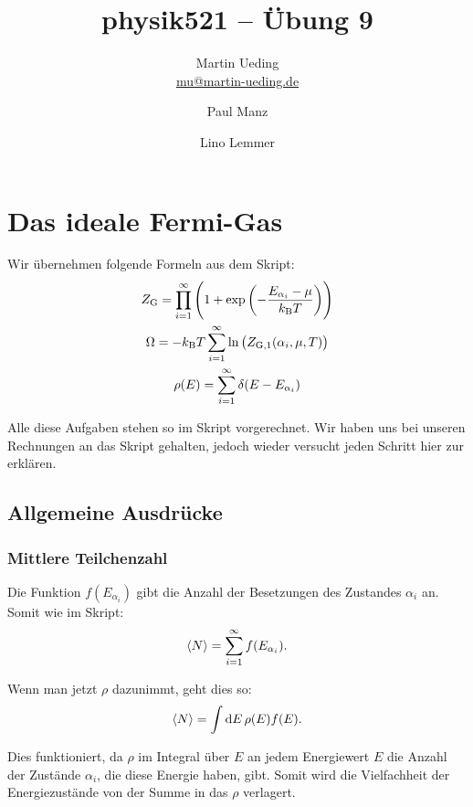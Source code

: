 

\hypersetup{
	pdftitle=
}

\title{physik521 -- Übung 9}
\author{
	Martin Ueding \\ \small{\href{mailto:mu@martin-ueding.de}{mu@martin-ueding.de}}
        \and
        Paul Manz
        \and
        Lino Lemmer
}



\maketitle

\section{Das ideale Fermi-Gas}

\newcommand\kB{k_\text B}
\newcommand\ZG{Z_\text G}
\newcommand\ZGe{Z_{\text G, 1}}
\newcommand\Eai{E_{\alpha_i}}
\newcommand\isum{\sum_{i=1}^\infty }

Wir übernehmen folgende Formeln aus dem Skript:
\begin{gather*}
    \ZG = \prod_{i=1}^\infty \del{1 + \exp\del{- \frac{\Eai - \mu}{\kB T}}} \\
    \Omega = - \kB T \isum \ln \del{\ZGe(\alpha_i, \mu, T)} \\
    \rho(E) = \isum \delta(E - \Eai)
\end{gather*}

Alle diese Aufgaben stehen so im Skript vorgerechnet. Wir haben uns bei
unseren Rechnungen an das Skript gehalten, jedoch wieder versucht jeden
Schritt hier zur erklären.

\subsection{Allgemeine Ausdrücke}

\subsubsection{Mittlere Teilchenzahl}

Die Funktion $f(\Eai)$ gibt die Anzahl der Besetzungen des Zustandes $\alpha_i$ an. Somit wie im Skript:
\[
    \bracket N = \isum f(\Eai).
\]

Wenn man jetzt $\rho$ dazunimmt, geht dies so:
\[
    \bracket N = \int \dif E \, \rho(E) f(E).
\]

Dies funktioniert, da $\rho$ im Integral über $E$ an jedem Energiewert $E$ die
Anzahl der Zustände $\alpha_i$, die diese Energie haben, gibt. Somit wird die
Vielfachheit der Energiezustände von der Summe in das $\rho$ verlagert.

